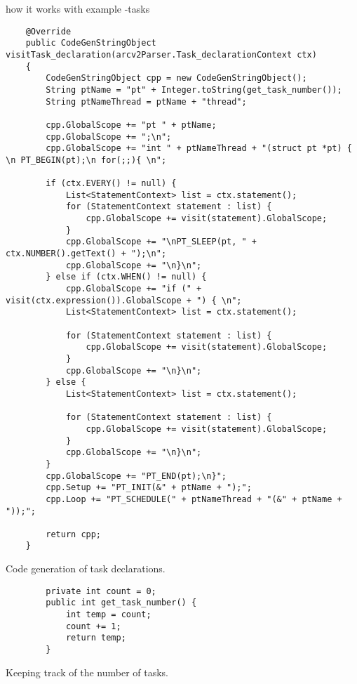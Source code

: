 how it works with example -tasks
\begin{listing}[htb!]
    \begin{verbatim}
    @Override
    public CodeGenStringObject visitTask_declaration(arcv2Parser.Task_declarationContext ctx)
    {
        CodeGenStringObject cpp = new CodeGenStringObject();
        String ptName = "pt" + Integer.toString(get_task_number());
        String ptNameThread = ptName + "thread";

        cpp.GlobalScope += "pt " + ptName;
        cpp.GlobalScope += ";\n";
        cpp.GlobalScope += "int " + ptNameThread + "(struct pt *pt) { \n PT_BEGIN(pt);\n for(;;){ \n";

        if (ctx.EVERY() != null) {
            List<StatementContext> list = ctx.statement();
            for (StatementContext statement : list) {
                cpp.GlobalScope += visit(statement).GlobalScope;
            }
            cpp.GlobalScope += "\nPT_SLEEP(pt, " + ctx.NUMBER().getText() + ");\n";
            cpp.GlobalScope += "\n}\n";
        } else if (ctx.WHEN() != null) {
            cpp.GlobalScope += "if (" + visit(ctx.expression()).GlobalScope + ") { \n";
            List<StatementContext> list = ctx.statement();

            for (StatementContext statement : list) {
                cpp.GlobalScope += visit(statement).GlobalScope;
            }
            cpp.GlobalScope += "\n}\n";
        } else {
            List<StatementContext> list = ctx.statement();
            
            for (StatementContext statement : list) {
                cpp.GlobalScope += visit(statement).GlobalScope;
            }
            cpp.GlobalScope += "\n}\n";
        }
        cpp.GlobalScope += "PT_END(pt);\n}";
        cpp.Setup += "PT_INIT(&" + ptName + ");";
        cpp.Loop += "PT_SCHEDULE(" + ptNameThread + "(&" + ptName + "));";

        return cpp;
    }
    \end{verbatim}
    \caption{Code generation of task declarations.}
    \label{lst:codeGenTask}
\end{listing}

\begin{listing}
    \begin{verbatim}
        private int count = 0;
        public int get_task_number() {
            int temp = count;
            count += 1;
            return temp;
        }
    \end{verbatim}
    \caption{Keeping track of the number of tasks.}
    \label{lst:codeGenTaskNumber}
\end{listing}


